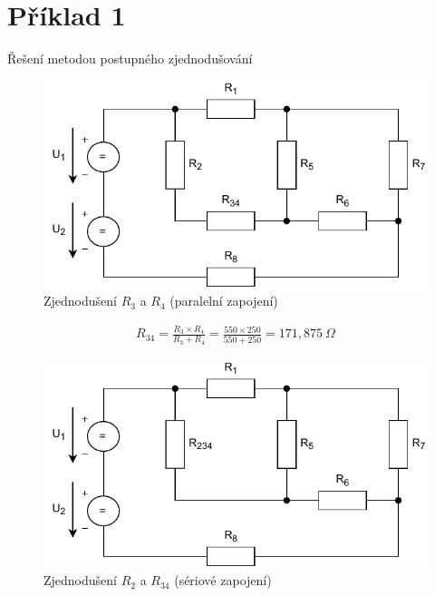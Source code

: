 \section{Příklad 1}

\begin{center}
    \begin{LARGE}
        Řešení metodou postupného zjednodušování
    \end{LARGE}
\end{center}

\begin{figure}[h]
    \centering
    \includegraphics[scale=0.8,keepaspectratio]{fig/Pr1_krok1.pdf}
    \caption{Zjednodušení $R_3$ a $R_4$ (paralelní zapojení)}
    \label{pic:Pr1_krok1}
\end{figure}

\begin{center}
    \begin{gather*}
        R_{34} = \frac{R_3 \times R_4}{R_3+R_4} = \frac{550 \times 250}{550+250} = 171,875 \: \Omega
    \end{gather*}
\end{center}

\newpage

\begin{figure}[h]
    \centering
    \includegraphics[scale=0.8,keepaspectratio]{fig/Pr1_krok2.pdf}
    \caption{Zjednodušení $R_2$ a $R_{34}$ (sériové zapojení)}
    \label{pic:Pr1_krok2}
\end{figure}

